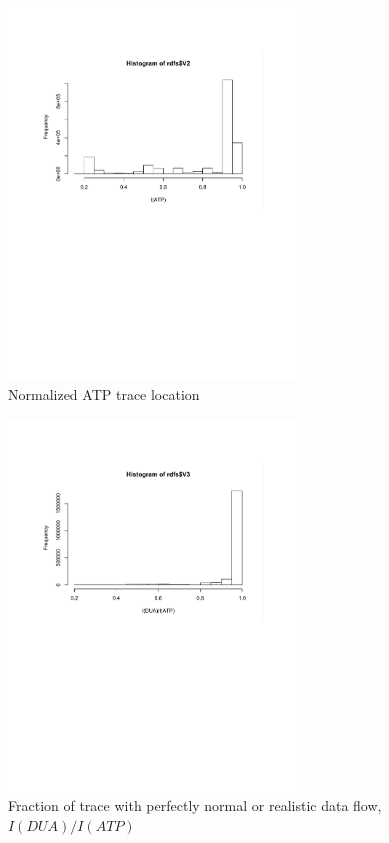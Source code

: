 \begin{figure}
\centering
\includegraphics[width=3in]{atp.pdf}
\caption{Normalized ATP trace location}
\label{fig:atp-hist}
\end{figure}

\begin{figure}
\centering
\includegraphics[width=3in]{rdf.pdf}
\caption{Fraction of trace with perfectly normal or realistic data flow, $I(DUA)/I(ATP)$}
\label{fig:rdf-hist}
\end{figure}




